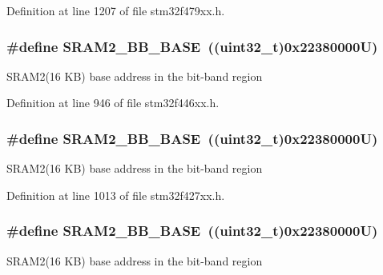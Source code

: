 Definition at line 1207 of file stm32f479xx.\+h.

\subsubsection[{\texorpdfstring{S\+R\+A\+M2\+\_\+\+B\+B\+\_\+\+B\+A\+SE}{SRAM2_BB_BASE}}]{\setlength{\rightskip}{0pt plus 5cm}\#define S\+R\+A\+M2\+\_\+\+B\+B\+\_\+\+B\+A\+SE~((uint32\+\_\+t)0x22380000\+U)}\hypertarget{group___peripheral__memory__map_gac33cb6edadf184ab9860d77089503922}{}\label{group___peripheral__memory__map_gac33cb6edadf184ab9860d77089503922}
S\+R\+A\+M2(16 K\+B) base address in the bit-\/band region 

Definition at line 946 of file stm32f446xx.\+h.

\subsubsection[{\texorpdfstring{S\+R\+A\+M2\+\_\+\+B\+B\+\_\+\+B\+A\+SE}{SRAM2_BB_BASE}}]{\setlength{\rightskip}{0pt plus 5cm}\#define S\+R\+A\+M2\+\_\+\+B\+B\+\_\+\+B\+A\+SE~((uint32\+\_\+t)0x22380000\+U)}\hypertarget{group___peripheral__memory__map_gac33cb6edadf184ab9860d77089503922}{}\label{group___peripheral__memory__map_gac33cb6edadf184ab9860d77089503922}
S\+R\+A\+M2(16 K\+B) base address in the bit-\/band region 

Definition at line 1013 of file stm32f427xx.\+h.

\subsubsection[{\texorpdfstring{S\+R\+A\+M2\+\_\+\+B\+B\+\_\+\+B\+A\+SE}{SRAM2_BB_BASE}}]{\setlength{\rightskip}{0pt plus 5cm}\#define S\+R\+A\+M2\+\_\+\+B\+B\+\_\+\+B\+A\+SE~((uint32\+\_\+t)0x22380000\+U)}\hypertarget{group___peripheral__memory__map_gac33cb6edadf184ab9860d77089503922}{}\label{group___peripheral__memory__map_gac33cb6edadf184ab9860d77089503922}
S\+R\+A\+M2(16 K\+B) base address in the bit-\/band region 

